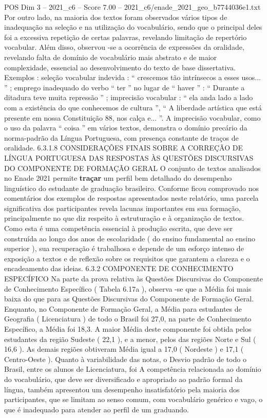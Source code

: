 \begin{textsample}{POS Dim 3 – 2021\_c6 – Score 7.00 – 2021\_c6/enade\_2021\_geo\_b7744036e1.txt}
Por outro lado, na maioria dos textos foram observados vários tipos de inadequação na seleção e na utilização do vocabulário, sendo que o principal deles foi a excessiva repetição de certas palavras, revelando limitação de repertório vocabular.
Além disso, observou -se a ocorrência de expressões da oralidade, revelando falta de domínio de vocabulário mais abstrato e de maior complexidade, essencial ao desenvolvimento do texto de base dissertativa.
Exemplos : seleção vocabular indevida : “ crescemos tão intrínsecos a esses usos... ” ; emprego inadequado do verbo “ ter ” no lugar de “ haver ” : “ Durante a ditadura teve muita repressão ” ; imprecisão vocabular : “ ela anda lado a lado com a existência do que conhecemos de cultura ”, “ A liberdade artística que está presente em nossa Constituição 88, nos calça e... ”.
A imprecisão vocabular, como o uso da palavra “ coisa ” em vários textos, demonstra o domínio precário da norma-padrão da Língua Portuguesa, com presença constante de traços de oralidade. 6.3.1.8 CONSIDERAÇÕES FINAIS SOBRE A CORREÇÃO DE LÍNGUA PORTUGUESA DAS RESPOSTAS ÀS QUESTÕES DISCURSIVAS DO COMPONENTE DE FORMAÇÃO GERAL O conjunto de textos analisados no Enade 2021 permite \textbf{traçar} um perfil bem detalhado do desempenho linguístico do estudante de graduação brasileiro.
Conforme ficou comprovado nos comentários dos exemplos de respostas apresentados neste relatório, uma parcela significativa dos participantes revela lacunas importantes em sua formação, principalmente no que diz respeito à estruturação e à organização de textos.
Como esta é uma competência essencial à produção escrita, que deve ser construída ao longo dos anos de escolaridade ( do ensino fundamental ao ensino superior ), sua recuperação é trabalhosa e depende de um esforço intenso de exposição a textos e de reflexão sobre os requisitos que garantem a clareza e o encadeamento das ideias. 6.3.2 COMPONENTE DE CONHECIMENTO ESPECÍFICO Na parte da prova relativa às Questões Discursivas do Componente de Conhecimento Específico ( Tabela 6.17a ), observa -se que a Média foi mais baixa do que para as Questões Discursivas do Componente de Formação Geral.
Enquanto, no Componente de Formação Geral, a Média para estudantes de Geografia ( Licenciatura ) de todo o Brasil foi 27,0, na parte de Conhecimento Específico, a Média foi 18,3.
A maior Média deste componente foi obtida pelos estudantes da região Sudeste ( 22,1 ), e a menor, pelos das regiões Norte e Sul ( 16,6 ).
As demais regiões obtiveram Média igual a 17,0 ( Nordeste ) e 17,1 ( Centro-Oeste ).
Quanto à variabilidade das notas, o Desvio padrão de todo o Brasil, entre os alunos de Licenciatura, foi A competência relacionada ao domínio do vocabulário, que deve ser diversificado e apropriado ao padrão formal da língua, também apresentou um desempenho insatisfatório pela maioria dos participantes, que se limitam ao senso comum, com vocabulário genérico e vago, o que é inadequado para atender ao perfil de um graduando.

\end{textsample}
